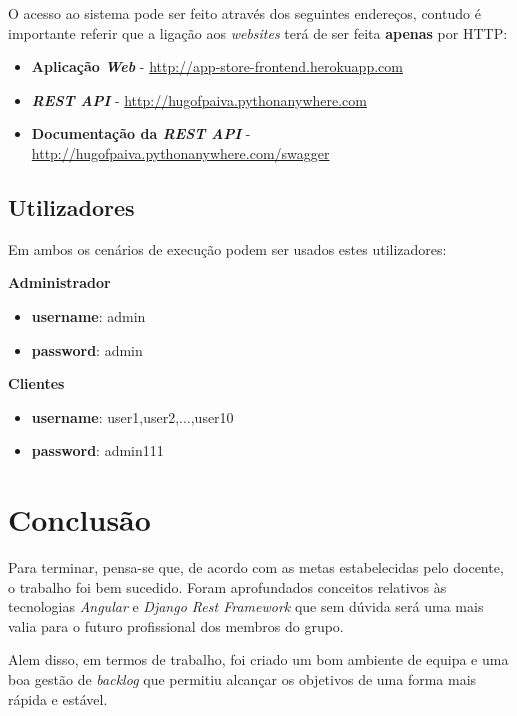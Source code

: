 \documentclass[10pt,english]{article}
\begin{document}
\par O acesso ao sistema pode ser feito através dos seguintes endereços, contudo é importante referir que a ligação aos \textit{websites} terá de ser feita \textbf{apenas} por HTTP:

\begin{itemize}
    \item \textbf{Aplicação \textit{Web}} - \url{http://app-store-frontend.herokuapp.com}
    \item \textbf{\textit{REST API}} - \url{http://hugofpaiva.pythonanywhere.com}
    \item \textbf{Documentação da \textit{REST API}} - \url{http://hugofpaiva.pythonanywhere.com/swagger}
\end{itemize}

\subsection{Utilizadores}

\par Em ambos os cenários de execução podem ser usados estes utilizadores:

\hfill

\textbf{Administrador}
\begin{itemize}
    \item \textbf{username}: admin
    \item \textbf{password}: admin
\end{itemize}

\textbf{Clientes}
\begin{itemize}
    \item \textbf{username}: user1,user2,...,user10
    \item \textbf{password}: admin111
\end{itemize}

\clearpage

\section{Conclusão}

\par Para terminar, pensa-se que, de acordo com as metas estabelecidas pelo docente, o trabalho foi bem sucedido. Foram aprofundados conceitos relativos às tecnologias \textit{Angular} e \textit{Django Rest Framework} que sem dúvida será uma mais valia para o futuro profissional dos membros do grupo.
\par Alem disso, em termos de trabalho, foi criado um bom ambiente de equipa e uma boa gestão de \textit{backlog} que permitiu alcançar os objetivos de uma forma mais rápida e estável. 
\end{document}
